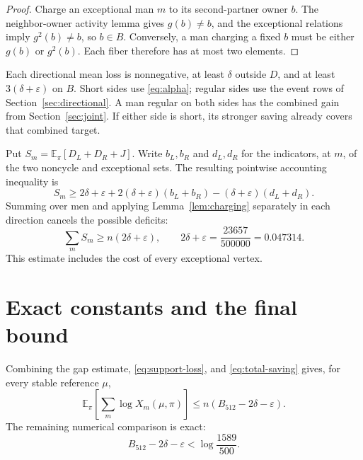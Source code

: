 \documentclass[11pt,letterpaper]{article}
\theoremstyle{remark}
\newcommand{\E}{\mathbb{E}}
\numberwithin{equation}{section}
\begin{document}
\begin{proof}
Charge an exceptional man \(m\) to its second-partner owner \(b\).
The neighbor-owner activity lemma gives \(g(b)\ne b\), and the
exceptional relations imply \(g^2(b)\ne b\), so \(b\in B\).
Conversely, a man charging a fixed \(b\) must be either \(g(b)\) or
\(g^2(b)\). Each fiber therefore has at most two elements.
\end{proof}

Each directional mean loss is nonnegative, at least \(\delta\) outside
\(D\), and at least \(3(\delta+\varepsilon)\) on \(B\). Short sides
use \eqref{eq:alpha}; regular sides use the event rows of
Section~\ref{sec:directional}. A man regular on both sides has the
combined gain from Section~\ref{sec:joint}. If either side is short,
its stronger saving already covers that combined target.

Put \(S_m=\E_\pi[D_L+D_R+J]\). Write \(b_L,b_R\) and \(d_L,d_R\)
for the indicators, at \(m\), of the two noncycle and exceptional
sets. The resulting pointwise accounting inequality is
\begin{equation}\label{eq:accounting}
  S_m\ge2\delta+\varepsilon
       +2(\delta+\varepsilon)(b_L+b_R)
       -(\delta+\varepsilon)(d_L+d_R).
\end{equation}
Summing over men and applying Lemma~\ref{lem:charging} separately
in each direction cancels the possible deficits:
\begin{equation}\label{eq:total-saving}
  \sum_m S_m\ge n(2\delta+\varepsilon),
  \qquad
  2\delta+\varepsilon=\frac{23657}{500000}=0.047314.
\end{equation}
This estimate includes the cost of every exceptional vertex.

\section{Exact constants and the final bound}
\label{sec:assembly}

Combining the gap estimate, \eqref{eq:support-loss}, and
\eqref{eq:total-saving} gives, for every stable reference \(\mu\),
\begin{equation}\label{eq:cost-bound}
  \E_\pi\!\left[\sum_m\log X_m(\mu,\pi)\right]
  \le n(B_{512}-2\delta-\varepsilon).
\end{equation}
The remaining numerical comparison is exact:
\begin{equation}\label{eq:final-certificate}
  B_{512}-2\delta-\varepsilon<\log\frac{1589}{500}.
\end{equation}
\end{document}
